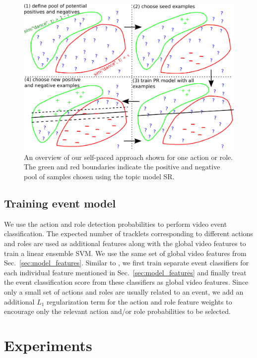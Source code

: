 \documentclass[10pt,twocolumn,letterpaper]{article}
\begin{document}
\begin{figure}
  \includegraphics[scale = 0.27]{../images/system2b.pdf}
  \caption{An overview of our self-paced approach shown for one action or role. 
  The green and red boundaries indicate the positive and negative pool of samples chosen using the topic model SR.}
\label{fig:system2}
\end{figure}

\vspace*{-4pt}

\subsection{Training event model}\label{sec:event_model}
We use the action and role detection probabilities to perform video event
classification. The expected number of tracklets corresponding to different
actions and roles are used as additional features along with the global video
features to train a linear ensemble SVM. We use the same set of global video
features from Sec.~\ref{sec:model_features}. Similar to \cite{Izadinia_ECCV12},
we first train separate event classifiers for each individual feature mentioned
in Sec.~\ref{sec:model_features} and finally treat the event classification
score from these classifiers as global video features. Since only a small set
of actions and roles are usually related to an event, we add an additional
$L_1$ regularization term for the action and role feature weights to encourage
only the relevant action and/or role probabilities to be selected.

\section{Experiments}
\end{document}
